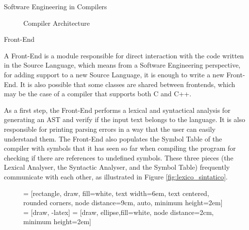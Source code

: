 \begin{section}{Software Engineering in Compilers}
\begin{figure}
\caption{Compiler Architecture}
\label{fig:compiler_arch}
\end{figure}

\begin{subsection}{Front-End}

A Front-End is a module responsible for direct interaction with the code
written in the Source Language, which means from a Software Engineering
perspective, for adding support to a new Source Language, it is enough to write
a new Front-End. It is also possible that some classes are shared between
frontends, which may be the case of a compiler that supports both C and C++.



As a first step, the Front-End performs a lexical and syntactical analysis for
generating an AST and verify if the input text belongs to the language. It is
also responsible for printing parsing errors in a way that the user can easily
understand them. The Front-End also populates the Symbol Table of the compiler
with symbols that it has seen so far when compiling the program for checking if
there are references to undefined symbols. These three pieces (the Lexical
Analyser, the Syntactic Analyser, and the Symbol Table) frequently communicate
with each other, as illustrated in Figure \ref{fig:lexico_sintatico}.


\begin{figure}
 = [rectangle, draw, fill=white,
    text width=6em, text centered, rounded corners, node distance=9cm, auto, minimum height=2em]
 = [draw, -latex]
 = [draw, ellipse,fill=white, node distance=2cm,
    minimum height=2em]

\begin{center}
\end{center}
\end{figure}
\end{subsection}
\end{section}
